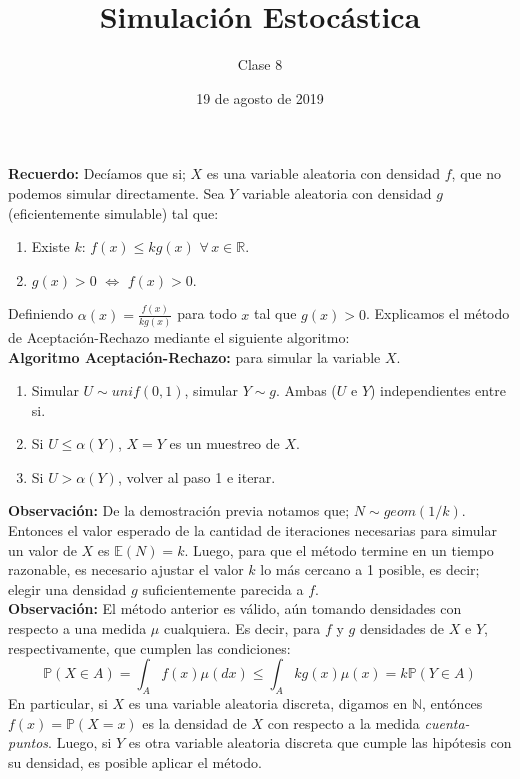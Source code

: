 \documentclass[a4paper]{article}
\title{Simulación Estocástica}
\author{Clase 8}
\date{19 de agosto de 2019}
\newcommand{\prob}{\mathbb{P}}
\numberwithin{equation}{subsection}
\numberwithin{definicion}{subsection}
\def\R{\mathbb R}
\def\N{\mathbb N}
\def\E{\mathbb E}
\begin{document}
\maketitle

\textbf{Recuerdo:} Decíamos que si; $X$ es una variable aleatoria con densidad $f$, que no podemos simular directamente. Sea $Y$ variable aleatoria con densidad $g$ (eficientemente simulable) tal que:
\begin{enumerate}
    \item Existe $k$: $f(x) \leq kg(x)$ $\forall\,x\in\R$.
    \item $g(x)>0$ $\Longleftrightarrow$ $f(x)>0$.
\end{enumerate}
Definiendo $\alpha(x) = \frac{f(x)}{kg(x)}$ para todo $x$ tal que $g(x)>0$. Explicamos el método de Aceptación-Rechazo mediante el siguiente algoritmo:\\ \newline
\textbf{Algoritmo Aceptación-Rechazo:} para simular la variable $X$.
\begin{enumerate}
    \item Simular $U\sim unif(0,1)$, simular $Y\sim g$. Ambas ($U$ e $Y$) independientes entre si.
    \item Si $U\leq \alpha(Y)$, $X=Y$ es un muestreo de $X$.
    \item Si $U> \alpha(Y)$, volver al paso 1 e iterar.
\end{enumerate}
\newline
\textbf{Observación: }De la demostración previa notamos que; $N\sim geom(1/k)$. Entonces el valor esperado de la cantidad de iteraciones necesarias para simular un valor de $X$ es $\E(N) = k$. Luego, para que el método termine en un tiempo razonable, es necesario ajustar el valor $k$ lo más cercano a 1 posible, es decir; elegir una densidad $g$ suficientemente parecida a $f$.\\ \newline
\textbf{Observación: }El método anterior es válido, aún tomando densidades con respecto a una medida $\mu$ cualquiera. Es decir, para $f$ y $g$ densidades de $X$ e $Y$, respectivamente, que cumplen las condiciones:
\[\prob\left(X\in A\right) = \int_{A}f(x)\mu(dx) \leq \int_{A}kg(x)\mu(x) = k\prob\left(Y\in A\right)\]
En particular, si $X$ es una variable aleatoria discreta, digamos en $\N$, entónces $f(x) = \prob(X=x)$ es la densidad de $X$ con respecto a la medida \textit{cuenta-puntos}. Luego, si $Y$ es otra variable aleatoria discreta que cumple las hipótesis con su densidad, es posible aplicar el método.
\end{document}
